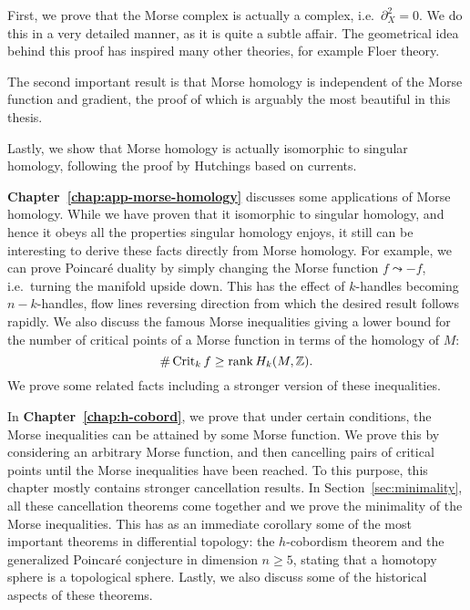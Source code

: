 First, we prove that the Morse complex is actually a complex, i.e.\ $\partial_X^2=0$.
We do this in a very detailed manner, as it is quite a subtle affair.
The geometrical idea behind this proof has inspired many other theories, for example Floer theory.

The second important result is that Morse homology is independent of the Morse function and gradient, the proof of which is arguably the most beautiful in this thesis.

Lastly, we show that Morse homology is actually isomorphic to singular homology, following the proof by Hutchings based on currents.

\textbf{Chapter~\ref{chap:app-morse-homology}} discusses some applications of Morse homology.
While we have proven that it isomorphic to singular homology, and hence it obeys all the properties singular homology enjoys, it still can be interesting to derive these facts directly from Morse homology.
For example, we can prove Poincaré duality by simply changing the Morse function $f \leadsto -f$, i.e.\ turning the manifold upside down.  This has the effect of $k$-handles becoming $n-k$-handles, flow lines reversing direction from which the desired result follows rapidly.
We also discuss the famous Morse inequalities giving a lower bound for the number of critical points of a Morse function in terms of the homology of $M$:
 \[
     \# \operatorname{Crit}_k f \ge \operatorname{rank} H_k(M, \mathbb{Z})
.\] 
We prove some related facts including a stronger version of these inequalities.

In \textbf{Chapter~\ref{chap:h-cobord}}, we prove that under certain conditions, the Morse inequalities can be attained by some Morse function.
We prove this by considering an arbitrary Morse function,
and then cancelling pairs of critical points until the Morse inequalities have been reached.
To this purpose, this chapter mostly contains stronger cancellation results.
In Section~\ref{sec:minimality}, all these cancellation theorems come together and we prove the minimality of the Morse inequalities.
This has as an immediate corollary some of the most important theorems in differential topology: the $h$-cobordism theorem and the generalized Poincaré conjecture in dimension $n \ge 5$, stating that a homotopy sphere is a topological sphere.
Lastly, we also discuss some of the historical aspects of these theorems.

